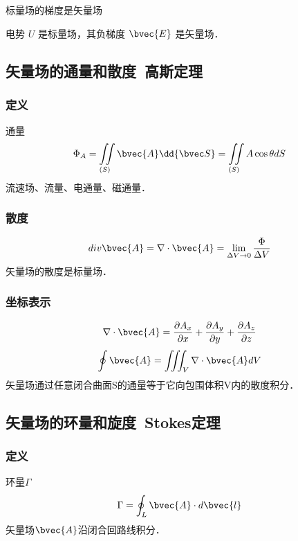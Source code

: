 标量场的梯度是矢量场

电势 $U$ 是标量场，其负梯度 $\bvec{E}$ 是矢量场．

\subsection{矢量场的通量和散度\ 高斯定理}%
\subsubsection{定义}
通量
\begin{equation}\label{VecAnl_eq6}
\Phi_A=\iint\limits_{(S)} \bvec{A} \dd{\bvec S} = \iint\limits_{(S)} A\cos\theta dS
\end{equation}
流速场、流量、电通量、磁通量．

\subsubsection{散度}
\begin{equation}\label{VecAnl_eq7}
div \bvec{A}=\nabla \cdot \bvec{A}=\lim_{\Delta V \to 0}\frac{\Phi}{\Delta V}
\end{equation}
矢量场的散度是标量场．

\subsubsection{坐标表示}
\begin{equation}\label{VecAnl_eq8}
\nabla \cdot \bvec{A}= \frac{\partial A_x}{\partial x}+\frac{\partial A_y}{\partial y}+\frac{\partial A_z}{\partial z}
\end{equation}
\begin{equation}\label{VecAnl_eq9}
\oint \bvec{A}=\iiint_V \nabla \cdot \bvec{A} dV
\end{equation}
矢量场通过任意闭合曲面S的通量等于它向包围体积V内的散度积分．
\subsection{矢量场的环量和旋度\ Stokes定理}%

\subsubsection{定义}
环量$\Gamma$
\begin{equation}\label{VecAnl_eq10}
\Gamma=\oint_L \bvec{A} \cdot d \bvec{l}
\end{equation}
矢量场$\bvec{A}$沿闭合回路线积分．

